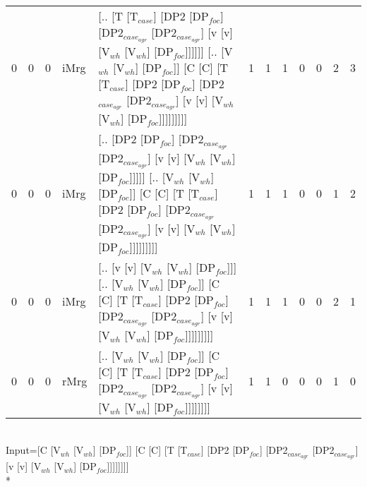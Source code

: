 \begin{tabularx}{\linewidth}{rrrlXrrrrrrr}
   0 &       0 &   0 & iMrg & [.. [T [T$_{case}$] [DP2 [DP$_{foc}$] [DP2$_{case_{agr}}$ [DP2$_{case_{agr}}$] [v [v] [V$_{wh}$ [V$_{wh}$] [DP$_{foc}$]]]]]] [.. [V$_{wh}$ [V$_{wh}$] [DP$_{foc}$]] [C [C] [T [T$_{case}$] [DP2 [DP$_{foc}$] [DP2$_{case_{agr}}$ [DP2$_{case_{agr}}$] [v [v] [V$_{wh}$ [V$_{wh}$] [DP$_{foc}$]]]]]]]]]         &             1 &             1 &            1 &              0 &             0 &          2 &        3 \\
   0 &       0 &   0 & iMrg & [.. [DP2 [DP$_{foc}$] [DP2$_{case_{agr}}$ [DP2$_{case_{agr}}$] [v [v] [V$_{wh}$ [V$_{wh}$] [DP$_{foc}$]]]]] [.. [V$_{wh}$ [V$_{wh}$] [DP$_{foc}$]] [C [C] [T [T$_{case}$] [DP2 [DP$_{foc}$] [DP2$_{case_{agr}}$ [DP2$_{case_{agr}}$] [v [v] [V$_{wh}$ [V$_{wh}$] [DP$_{foc}$]]]]]]]]]                      &             1 &             1 &            1 &              0 &             0 &          1 &        2 \\
   0 &       0 &   0 & iMrg & [.. [v [v] [V$_{wh}$ [V$_{wh}$] [DP$_{foc}$]]] [.. [V$_{wh}$ [V$_{wh}$] [DP$_{foc}$]] [C [C] [T [T$_{case}$] [DP2 [DP$_{foc}$] [DP2$_{case_{agr}}$ [DP2$_{case_{agr}}$] [v [v] [V$_{wh}$ [V$_{wh}$] [DP$_{foc}$]]]]]]]]]                                                                   &             1 &             1 &            1 &              0 &             0 &          2 &        1 \\
   0 &       0 &   0 & rMrg & [.. [V$_{wh}$ [V$_{wh}$] [DP$_{foc}$]] [C [C] [T [T$_{case}$] [DP2 [DP$_{foc}$] [DP2$_{case_{agr}}$ [DP2$_{case_{agr}}$] [v [v] [V$_{wh}$ [V$_{wh}$] [DP$_{foc}$]]]]]]]]                                                                                                       &             1 &             1 &            0 &              0 &             0 &          1 &        0 \\
\hline
\end{tabularx}\endgroup\\
\begingroup\scriptsize Input=[C [V$_{wh}$ [V$_{wh}$] [DP$_{foc}$]] [C [C] [T [T$_{case}$] [DP2 [DP$_{foc}$] [DP2$_{case_{agr}}$ [DP2$_{case_{agr}}$] [v [v] [V$_{wh}$ [V$_{wh}$] [DP$_{foc}$]]]]]]]]\\*
